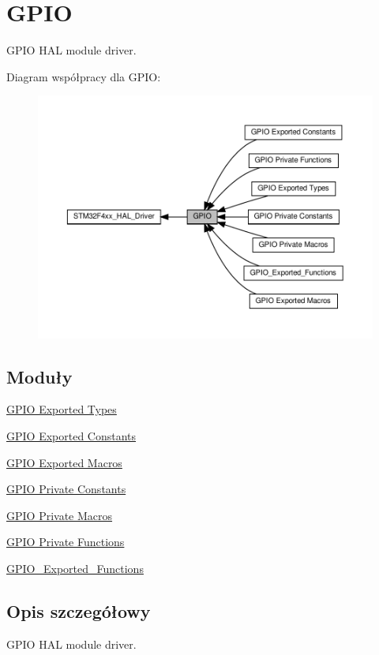 \hypertarget{group___g_p_i_o}{}\section{G\+P\+IO}
\label{group___g_p_i_o}


G\+P\+IO H\+AL module driver.  


Diagram współpracy dla G\+P\+IO\+:\nopagebreak
\begin{figure}[H]
\begin{center}
\leavevmode
\includegraphics[width=350pt]{group___g_p_i_o}
\end{center}
\end{figure}
\subsection*{Moduły}
\begin{DoxyCompactItemize}
\item 
\hyperlink{group___g_p_i_o___exported___types}{G\+P\+I\+O Exported Types}
\item 
\hyperlink{group___g_p_i_o___exported___constants}{G\+P\+I\+O Exported Constants}
\item 
\hyperlink{group___g_p_i_o___exported___macros}{G\+P\+I\+O Exported Macros}
\item 
\hyperlink{group___g_p_i_o___private___constants}{G\+P\+I\+O Private Constants}
\item 
\hyperlink{group___g_p_i_o___private___macros}{G\+P\+I\+O Private Macros}
\item 
\hyperlink{group___g_p_i_o___private___functions}{G\+P\+I\+O Private Functions}
\item 
\hyperlink{group___g_p_i_o___exported___functions}{G\+P\+I\+O\+\_\+\+Exported\+\_\+\+Functions}
\end{DoxyCompactItemize}


\subsection{Opis szczegółowy}
G\+P\+IO H\+AL module driver. 

